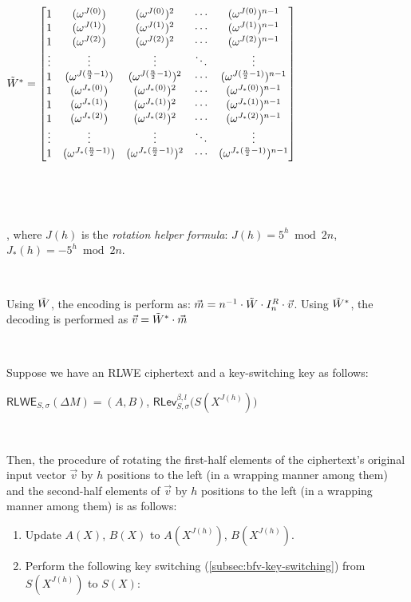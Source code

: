 \begin{tcolorbox}[title={\textbf{\tboxlabel{\ref*{subsec:bfv-rotation}} BFV's Homomorphic Rotation of Input Vector Slots}}]
$\tilde{W}^* = \begin{bmatrix}
1 & (\omega^{J(0)}) & (\omega^{J(0)})^2 & \cdots & (\omega^{J(0)})^{n-1}\\
1 & (\omega^{J(1)}) & (\omega^{J(1)})^2 & \cdots & (\omega^{J(1)})^{n-1}\\
1 & (\omega^{J(2)}) & (\omega^{J(2)})^2 & \cdots & (\omega^{J(2)})^{n-1}\\
\vdots & \vdots & \vdots & \ddots & \vdots \\
1 & (\omega^{J(\frac{n}{2}-1)}) & (\omega^{J(\frac{n}{2}-1)})^2 & \cdots & (\omega^{J(\frac{n}{2}-1)})^{n-1}\\
1 & (\omega^{J_*(0)}) & (\omega^{J_*(0)})^2 & \cdots & (\omega^{J_*(0)})^{n-1}\\
1 & (\omega^{J_*(1)}) & (\omega^{J_*(1)})^2 & \cdots & (\omega^{J_*(1)})^{n-1}\\
1 & (\omega^{J_*(2)}) & (\omega^{J_*(2)})^2 & \cdots & (\omega^{J_*(2)})^{n-1}\\
\vdots & \vdots & \vdots & \ddots & \vdots \\
1 & (\omega^{J_*(\frac{n}{2}-1)}) & (\omega^{J_*(\frac{n}{2}-1)})^2 & \cdots & (\omega^{J_*(\frac{n}{2}-1)})^{n-1}\\
\end{bmatrix}$

$ $

$ $

, where $J(h)$ is the \textit{rotation helper formula}: $J(h) = 5^h \bmod 2n$, 
\text{ } $J_*(h) = -5^h \bmod 2n$. 

$ $

Using $\tilde{W}$, the encoding is perform as: $\vec{m} = n^{-1}\cdot \tilde{W} \cdot I_n^R \cdot \vec{v}$. Using $\tilde{W}^*$, the decoding is performed as $\vec{v} = \tilde{W}^* \cdot \vec{m}$

$ $

Suppose we have an RLWE ciphertext and a key-switching key as follows:

$\textsf{RLWE}_{S, \sigma}(\Delta M) = (A, B)$, \text{ } $\textsf{RLev}_{S, \sigma}^{\beta, l}\bm(S(X^{J(h)})\bm)$

$ $

Then, the procedure of rotating the first-half elements of the ciphertext's original input vector $\vec{v}$ by $h$ positions to the left (in a wrapping manner among them) and the second-half elements of $\vec{v}$ by $h$ positions to the left (in a wrapping manner among them) is as follows: 

\begin{enumerate}
\item Update $A(X)$, $B(X)$ to $A(X^{J(h)})$, $B(X^{J(h)})$. 
\item Perform the following key switching (\autoref{subsec:bfv-key-switching}) from $S(X^{J(h)})$ to $S(X)$:


\end{enumerate}
\end{tcolorbox}
